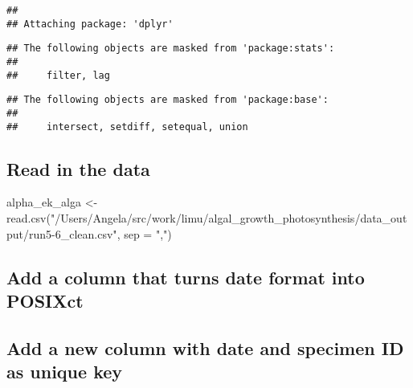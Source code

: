\documentclass[
]{article}
\newenvironment{Shaded}{\begin{snugshade}}{\end{snugshade}}
\newcommand{\AttributeTok}[1]{\textcolor[rgb]{0.77,0.63,0.00}{#1}}
\newcommand{\FunctionTok}[1]{\textcolor[rgb]{0.00,0.00,0.00}{#1}}
\newcommand{\NormalTok}[1]{#1}
\newcommand{\OtherTok}[1]{\textcolor[rgb]{0.56,0.35,0.01}{#1}}
\newcommand{\SpecialCharTok}[1]{\textcolor[rgb]{0.00,0.00,0.00}{#1}}
\newcommand{\StringTok}[1]{\textcolor[rgb]{0.31,0.60,0.02}{#1}}
\begin{document}
\begin{verbatim}
## 
## Attaching package: 'dplyr'
\end{verbatim}

\begin{verbatim}
## The following objects are masked from 'package:stats':
## 
##     filter, lag
\end{verbatim}

\begin{verbatim}
## The following objects are masked from 'package:base':
## 
##     intersect, setdiff, setequal, union
\end{verbatim}

\hypertarget{read-in-the-data}{%
\subsection{Read in the data}\label{read-in-the-data}}

\begin{Shaded}
\begin{Highlighting}[]
\NormalTok{alpha\_ek\_alga }\OtherTok{\textless{}{-}} \FunctionTok{read.csv}\NormalTok{(}\StringTok{"/Users/Angela/src/work/limu/algal\_growth\_photosynthesis/data\_output/run5{-}6\_clean.csv"}\NormalTok{, }\AttributeTok{sep =} \StringTok{","}\NormalTok{)}
\end{Highlighting}
\end{Shaded}

\hypertarget{add-a-column-that-turns-date-format-into-posixct}{%
\subsection{Add a column that turns date format into
POSIXct}\label{add-a-column-that-turns-date-format-into-posixct}}

\begin{Shaded}
\end{Shaded}

\hypertarget{add-a-new-column-with-date-and-specimen-id-as-unique-key}{%
\subsection{Add a new column with date and specimen ID as unique
key}\label{add-a-new-column-with-date-and-specimen-id-as-unique-key}}
\end{document}
